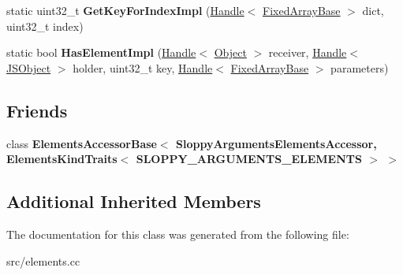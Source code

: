 \begin{DoxyCompactItemize}
\item 
\hypertarget{classv8_1_1internal_1_1_sloppy_arguments_elements_accessor_a2b6a15dd69654d73398c5199af37a007}{}static uint32\+\_\+t {\bfseries Get\+Key\+For\+Index\+Impl} (\hyperlink{classv8_1_1internal_1_1_handle}{Handle}$<$ \hyperlink{classv8_1_1internal_1_1_fixed_array_base}{Fixed\+Array\+Base} $>$ dict, uint32\+\_\+t index)\label{classv8_1_1internal_1_1_sloppy_arguments_elements_accessor_a2b6a15dd69654d73398c5199af37a007}

\item 
\hypertarget{classv8_1_1internal_1_1_sloppy_arguments_elements_accessor_a44346aac7aca2e63e7a3ab66f6693ca4}{}static bool {\bfseries Has\+Element\+Impl} (\hyperlink{classv8_1_1internal_1_1_handle}{Handle}$<$ \hyperlink{classv8_1_1internal_1_1_object}{Object} $>$ receiver, \hyperlink{classv8_1_1internal_1_1_handle}{Handle}$<$ \hyperlink{classv8_1_1internal_1_1_j_s_object}{J\+S\+Object} $>$ holder, uint32\+\_\+t key, \hyperlink{classv8_1_1internal_1_1_handle}{Handle}$<$ \hyperlink{classv8_1_1internal_1_1_fixed_array_base}{Fixed\+Array\+Base} $>$ parameters)\label{classv8_1_1internal_1_1_sloppy_arguments_elements_accessor_a44346aac7aca2e63e7a3ab66f6693ca4}

\end{DoxyCompactItemize}
\subsection*{Friends}
\begin{DoxyCompactItemize}
\item 
\hypertarget{classv8_1_1internal_1_1_sloppy_arguments_elements_accessor_a88497d7e38cb319dbf44d5cbe6a6ab3c}{}class {\bfseries Elements\+Accessor\+Base$<$ Sloppy\+Arguments\+Elements\+Accessor, Elements\+Kind\+Traits$<$ S\+L\+O\+P\+P\+Y\+\_\+\+A\+R\+G\+U\+M\+E\+N\+T\+S\+\_\+\+E\+L\+E\+M\+E\+N\+T\+S $>$ $>$}\label{classv8_1_1internal_1_1_sloppy_arguments_elements_accessor_a88497d7e38cb319dbf44d5cbe6a6ab3c}

\end{DoxyCompactItemize}
\subsection*{Additional Inherited Members}


The documentation for this class was generated from the following file\+:\begin{DoxyCompactItemize}
\item 
src/elements.\+cc\end{DoxyCompactItemize}
